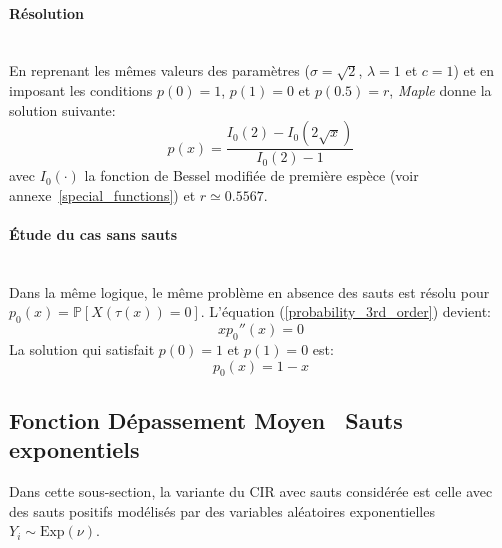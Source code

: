 \paragraph{Résolution}\phantom{}\\
En reprenant les mêmes valeurs des paramètres ($\sigma=\sqrt{2}$, $\lambda=1$ et $c=1$) et en imposant les conditions $p(0)=1$, $p(1)=0$ et $p(0.5)=r$, \textit{Maple} donne la solution suivante:
\begin{equation}\label{sol_probability_with_jumps}
    p(x)=\frac{I_0(2)-I_0(2\sqrt{x})}{I_0(2)-1}
\end{equation}
avec $I_0(\cdot)$ la fonction de Bessel modifiée de première espèce (voir annexe~\ref{special_functions}) et $r\simeq0.5567$.
\paragraph{Étude du cas sans sauts}\phantom{}\\
Dans la même logique, le même problème en absence des sauts est résolu pour $p_0(x)=\mathds{P}[X(\tau(x))=0]$. L'équation (\ref{probability_3rd_order}) devient:
\[
xp_0''(x)=0
\]
La solution qui satisfait $p(0)=1$ et $p(1)=0$ est:
\begin{equation}\label{sol_probability}
    p_0(x)=1-x
\end{equation}

\subsection{Fonction Dépassement Moyen \textemdash~Sauts exponentiels}
Dans cette sous-section, la variante du \ac{CIR} avec sauts considérée est celle avec des sauts positifs modélisés par des variables aléatoires exponentielles $Y_i\sim \text{Exp}(\nu)$.

